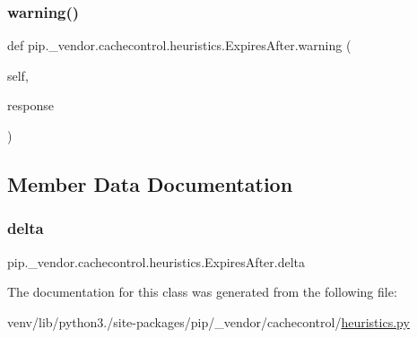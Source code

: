 \subsubsection{\texorpdfstring{warning()}{warning()}}
{\footnotesize\ttfamily def pip.\+\_\+vendor.\+cachecontrol.\+heuristics.\+Expires\+After.\+warning (\begin{DoxyParamCaption}\item[{}]{self,  }\item[{}]{response }\end{DoxyParamCaption})}



\subsection{Member Data Documentation}
\mbox{\label{classpip_1_1__vendor_1_1cachecontrol_1_1heuristics_1_1ExpiresAfter_a103c51f0191cdb19f8d11a39f2e11336}} 
\subsubsection{\texorpdfstring{delta}{delta}}
{\footnotesize\ttfamily pip.\+\_\+vendor.\+cachecontrol.\+heuristics.\+Expires\+After.\+delta}



The documentation for this class was generated from the following file\+:\begin{DoxyCompactItemize}
\item 
venv/lib/python3./site-\/packages/pip/\+\_\+vendor/cachecontrol/\hyperlink{heuristics_8py}{heuristics.\+py}\end{DoxyCompactItemize}

